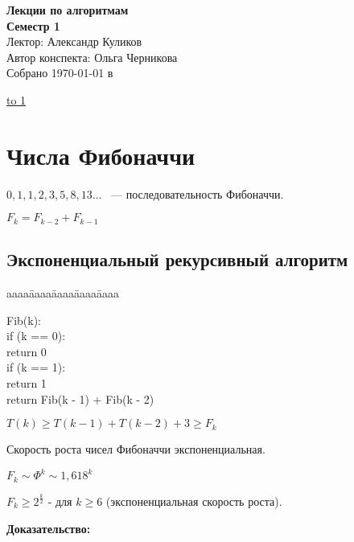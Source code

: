 \documentclass[12pt]{article}
\def\t{\texttt}
\newenvironment{MyTabbing}{
\t\bgroup
\begin{tabbing}
aaaa\=aaaa\=aaaa\=aaaa\=aaaa\kill
}{
\end{tabbing}
\t\egroup
}
\begin{document}
\begin{center}
  {\Large \bf Лекции по алгоритмам} \\ 
  \vspace{0.5em}
  {\Large \bf Семестр 1} \\
  \vspace{0.5em}
  {\Large Лектор: Александр Куликов} \\
  \vspace{0.5em}
  {\large Автор конспекта: Ольга Черникова} \\
  \vspace{0.5em}
  {Собрано {\today} в {\currenttime}}
\end{center}

\vspace{-1em}
\noindent \underline{\hbox to 1\textwidth{{ } \hfil{ } \hfil{ } }}

\vspace{1em}
\tableofcontents
\pagebreak

\section{Числа Фибоначчи}

$0, 1, 1, 2, 3, 5, 8, 13 \ldots$ ~--- последовательность Фибоначчи.

$F_k = F_{k - 2} + F_{k - 1}$

\subsection{Экспоненциальный рекурсивный алгоритм}

\begin{MyTabbing} 
Fib(k):\\
\>if (k == 0):\\
\>\>return 0\\
\>if (k == 1):\\
\>\>return 1\\
\>return Fib(k - 1) + Fib(k - 2)\\
\end{MyTabbing}

$T(k) \ge T(k - 1) + T(k - 2) + 3 \ge F_k$

Скорость роста чисел Фибоначчи экспоненциальная. 

$F_k \sim \Phi^k \sim 1,618^k$

$F_k \ge 2^{\frac{k}{2}}$ - для $k \ge 6$ (экспоненциальная скорость роста).

{\bf Доказательство:}
\end{document}
